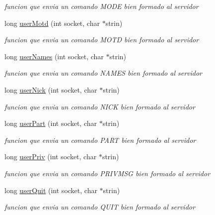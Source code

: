 \begin{DoxyCompactItemize}
\begin{DoxyCompactList}\small\item\em funcion que envia un comando M\-O\-D\-E bien formado al servidor \end{DoxyCompactList}\item 
long \hyperlink{_g-2301-05-_p2-user_commands_8c_aa5e23ebf9d8d7f2212750a7d0b25cb15}{user\-Motd} (int socket, char $\ast$strin)
\begin{DoxyCompactList}\small\item\em funcion que envia un comando M\-O\-T\-D bien formado al servidor \end{DoxyCompactList}\item 
long \hyperlink{_g-2301-05-_p2-user_commands_8c_a15f6b4ed406c22d7cedebf968c431a38}{user\-Names} (int socket, char $\ast$strin)
\begin{DoxyCompactList}\small\item\em funcion que envia un comando N\-A\-M\-E\-S bien formado al servidor \end{DoxyCompactList}\item 
long \hyperlink{_g-2301-05-_p2-user_commands_8c_abbde12342143708da5cbbe02b42c6269}{user\-Nick} (int socket, char $\ast$strin)
\begin{DoxyCompactList}\small\item\em funcion que envia un comando N\-I\-C\-K bien formado al servidor \end{DoxyCompactList}\item 
long \hyperlink{_g-2301-05-_p2-user_commands_8c_a4bd2ce0bd04f220d817a5fdc05ce02c9}{user\-Part} (int socket, char $\ast$strin)
\begin{DoxyCompactList}\small\item\em funcion que envia un comando P\-A\-R\-T bien formado al servidor \end{DoxyCompactList}\item 
long \hyperlink{_g-2301-05-_p2-user_commands_8c_abf18bb836181af4b31693795692475b6}{user\-Priv} (int socket, char $\ast$strin)
\begin{DoxyCompactList}\small\item\em funcion que envia un comando P\-R\-I\-V\-M\-S\-G bien formado al servidor \end{DoxyCompactList}\item 
long \hyperlink{_g-2301-05-_p2-user_commands_8c_a9be44d33843127f69f9f10616c00e8a1}{user\-Quit} (int socket, char $\ast$strin)
\begin{DoxyCompactList}\small\item\em funcion que envia un comando Q\-U\-I\-T bien formado al servidor \end{DoxyCompactList}\item 

\end{DoxyCompactItemize}
